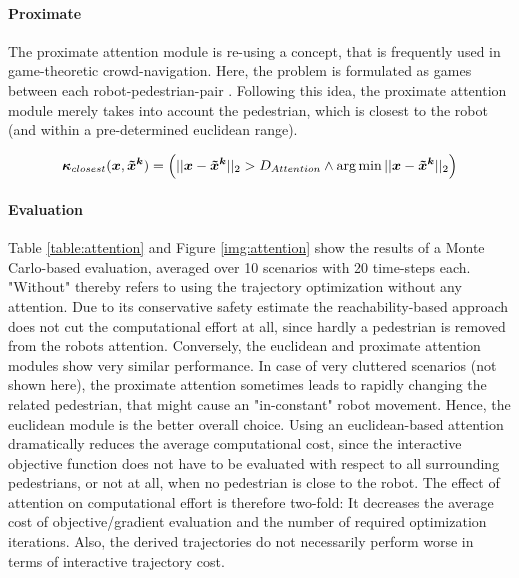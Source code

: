 \paragraph{Proximate}
The proximate attention module is re-using a concept, that is frequently used in game-theoretic crowd-navigation. Here, the problem is formulated as games between each robot-pedestrian-pair \cite{Bouzat2014}\cite{Nikolaidis2017}. Following this idea, the proximate attention module merely takes into account the pedestrian, which is closest to the robot (and within a pre-determined euclidean range).

\begin{equation}
\attention_{closest}(\x, \xped[k]) = \left( ||\x - \xped[k]||_2 > D_{Attention} \land \arg \min ||\x - \xped[k]||_2 \right)
\end{equation}

\paragraph{Evaluation}
Table \ref{table:attention} and Figure \ref{img:attention} show the results of a Monte Carlo-based evaluation, averaged over 10 scenarios with 20 time-steps each. "Without" thereby refers to using the trajectory optimization without any attention. Due to its conservative safety estimate the reachability-based approach does not cut the computational effort at all, since hardly a pedestrian is removed from the robots attention. Conversely, the euclidean and proximate attention modules show very similar performance. In case of very cluttered scenarios (not shown here), the proximate attention sometimes leads to rapidly changing the related pedestrian, that might cause an "in-constant" robot movement. Hence, the euclidean module is the better overall choice.
\newline
Using an euclidean-based attention dramatically reduces the average computational cost, since the interactive objective function does not have to be evaluated with respect to all surrounding pedestrians, or not at all, when no pedestrian is close to the robot. The effect of attention on computational effort is therefore two-fold: It decreases the average cost of objective/gradient evaluation and the number of required optimization iterations. Also, the derived trajectories do not necessarily perform worse in terms of interactive trajectory cost. 

